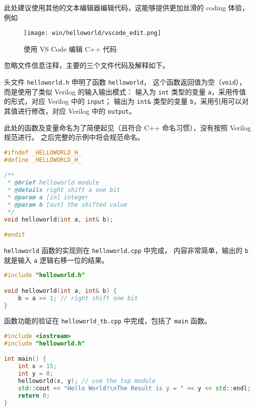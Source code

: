 \documentclass[Chinese,TC,use boldface,simple Names]{beaulivre}
\begin{document}
    此处建议使用其他的文本编辑器编辑代码，这能够提供更加丝滑的 coding 体验，例如
    \begin{figure}[htbp]
      \centering
      \texttt{[image: win/helloworld/vscode\_edit.png]}
      \caption{使用 VS Code 编辑 C++ 代码}
    \end{figure}

    忽略文件信息注释，主要的三个文件代码及解释如下。

    头文件 \texttt{helloworld.h} 申明了函数 \texttt{helloworld}，
    这个函数返回值为空（\texttt{void}），
    而是使用了类似 Verilog 的输入输出模式：
    输入为 \texttt{int} 类型的变量 \texttt{a}，采用传值的形式，对应 Verilog 中的 \texttt{input}；
    输出为 \texttt{int\&} 类型的变量 \texttt{b}，采用引用可以对其值进行修改，对应 Verilog 中的 \texttt{output}。
    \begin{warning}
      此处的函数及变量命名为了简便起见（且符合 C++ 命名习惯），没有按照 Verilog 规范进行。
      之后完整的示例中将会规范命名。
    \end{warning}
    \begin{lstlisting}[language=C++, title={helloworld.h}]
#ifndef _HELLOWORLD_H_
#define _HELLOWORLD_H_

/**
 * @brief helloworld module
 * @details right shift a one bit
 * @param a [in] integer
 * @param b [out] the shifted value
 */
void helloworld(int a, int& b);

#endif
    \end{lstlisting}
    
    \texttt{helloworld} 函数的实现则在 \texttt{helloworld.cpp} 中完成，
    内容非常简单，输出的 \texttt{b} 就是输入 \texttt{a} 逻辑右移一位的结果。
    \begin{lstlisting}[language=C++, title={helloworld.cpp}]
#include "helloworld.h"

void helloworld(int a, int& b) {
    b = a >> 1; // right shift one bit
}
    \end{lstlisting}

    函数功能的验证在 \texttt{helloworld\_tb.cpp} 中完成，包括了 \texttt{main} 函数。
    \begin{lstlisting}[language=C++, title={helloworld\_tb.cpp},morekeywords={std,cout,endl}]
#include <iostream>
#include "helloworld.h"

int main() {
    int x = 15;
    int y = 0;
    helloworld(x, y); // use the top module
    std::cout << "Hello World!\nThe Result is y = " << y << std::endl;
    return 0;
}
    \end{lstlisting}
\end{document}
